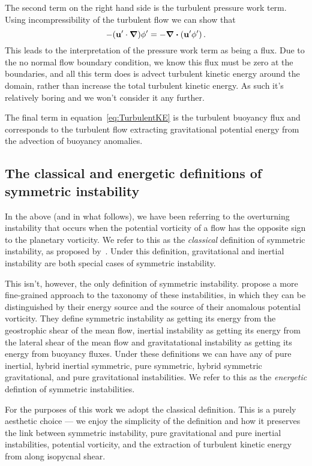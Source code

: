     The second term on the right hand side is the turbulent pressure work term. Using incompressibility of the turbulent flow we can show that
    \begin{equation}
       - (\mathbf{u}'\cdot \grad) \phi ' = - \div{(\mathbf{u'}\phi ')} \, .
    \end{equation}
    This leads to the interpretation of the pressure work term as being a flux. Due to the no normal flow boundary condition, we know this flux must be zero at the boundaries, and all this term does is advect turbulent kinetic energy around the domain, rather than increase the total turbulent kinetic energy. As such it's relatively boring and we won't consider it any further.
    
    The final term in equation~\ref{eq:TurbulentKE} is the turbulent buoyancy flux and corresponds to the turbulent flow extracting gravitational potential energy from the advection of buoyancy anomalies.

    \subsection{The classical and energetic definitions of symmetric instability}
    In the above (and in what follows), we have been referring to the overturning instability that occurs when the potential vorticity of a flow has the opposite sign to the planetary vorticity. We refer to this as the \textit{classical} definition of symmetric instability, as proposed by~\citet{Hoskins1974}. Under this definition, gravitational and inertial instability are both special cases of symmetric instability. 
    
    This isn't, however, the only definition of symmetric instability. \citet{Thomas2013} propose a more fine-grained approach to the taxonomy of these instabilities, in which they can be distinguished by their energy source and the source of their anomalous potential vorticity. They define symmetric instability as getting its energy from the geostrophic shear of the mean flow, inertial instability as getting its energy from the lateral shear of the mean flow and gravitatational instability as getting its energy from buoyancy fluxes. Under these definitions we can have any of pure inertial, hybrid inertial symmetric, pure symmetric, hybrid symmetric gravitational, and pure gravitational instabilities. We refer to this as the \textit{energetic} defintion of symmetric instabilities.

    For the purposes of this work we adopt the classical definition. This is a purely aesthetic choice --- we enjoy the simplicity of the definition and how it preserves the link between symmetric instability, pure gravitational and pure inertial instabilities, potential vorticity, and the extraction of turbulent kinetic energy from along isopycnal shear.

